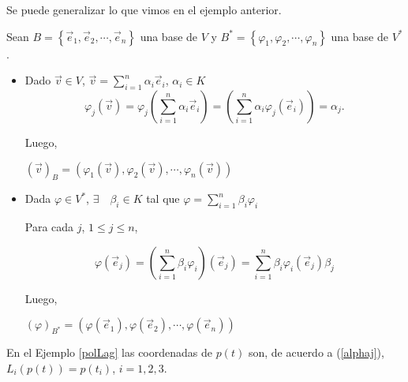 Se puede generalizar lo que vimos en el ejemplo anterior. 

\bigskip

Sean 
$B= \left\{\vec{e}_1,\vec{e}_2,\cdots, \vec{e}_n\right\}$ una base de  $V$  y $B^*= \left\{\varphi_1,\varphi_2,\cdots, \varphi_n\right\}$ una base de  $V^*$.


\bigskip

\begin{itemize}
\item
Dado  $\vec{v} \in V$, $\vec{v}=  \sum_{i=1}^n  \alpha_i \vec{e}_i  $,  $ \alpha_i \in K  $
\begin{equation}
 \label{alphaj}   
 \varphi_j(\vec{v}) = \varphi_j( \sum_{i=1}^n  \alpha_i \vec{e}_i)=  ( \sum_{i=1}^n  \alpha_i \varphi_j(\vec{e}_i))= \alpha_j.
\end{equation}

\bigskip

Luego, 

\bigskip


$ (\vec{v} )_B=   ( \varphi_1( \vec{v} ), \varphi_2( \vec{v} ),  \cdots,   \varphi_n( \vec{v} ) ) $

\bigskip

\item

Dada $\varphi \in  V^* $, $\exists \quad \beta_i \in K   $ tal que  $\varphi=  \sum_{i=1}^n  \beta_i \varphi_i  $

\bigskip

Para cada $j$, $   1 \le j \le n$, 


\begin{equation}
 \label{betaj}   
\varphi(\vec{e}_j )  = (\sum_{i=1}^n  \beta_i \varphi_i) (\vec{e}_j ) = \sum_{i=1}^n  \beta_i \varphi_i (\vec{e}_j )  \beta_j   
\end{equation}
\bigskip

Luego, 

\bigskip

$(\varphi)_{B^*}= ( \varphi(\vec{e}_1 )   ,   \varphi(\vec{e}_2),  \cdots,  \varphi(\vec{e}_n  ))$



\end{itemize}

\bigskip

\begin{remark}
En el Ejemplo \ref{polLag} las coordenadas de $p(t)$ son, de acuerdo a (\ref{alphaj}), $L_i(p(t))=p(t_i)$, $i=1,2,3$.
\end{remark}

